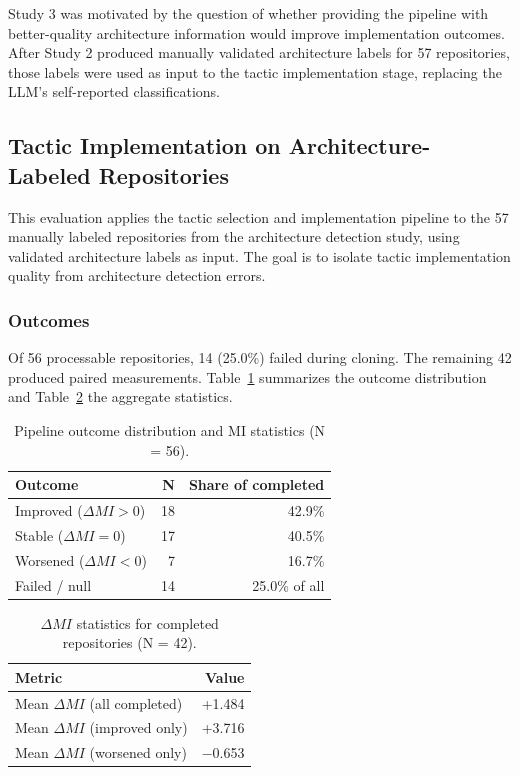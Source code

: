Study 3 was motivated by the question of whether providing the pipeline with better-quality architecture information would improve implementation outcomes. After Study 2 produced manually validated architecture labels for 57 repositories, those labels were used as input to the tactic implementation stage, replacing the LLM's self-reported classifications.

\subsection{Tactic Implementation on Architecture-Labeled Repositories}
\label{subsec:eval_tactic_impl}

This evaluation applies the tactic selection and implementation pipeline to the 57 manually labeled repositories from the architecture detection study, using validated architecture labels as input. The goal is to isolate tactic implementation quality from architecture detection errors.

\subsubsection*{Outcomes}

Of 56 processable repositories, 14 (25.0\%) failed during cloning. The remaining 42 produced paired measurements. Table~\ref{tab:exp5_outcomes} summarizes the outcome distribution and Table~\ref{tab:exp5_all} the aggregate statistics.

\begin{table}[H]
\centering
\small
\caption{Pipeline outcome distribution and MI statistics (N = 56).}
\label{tab:exp5_outcomes}
\begin{tabular}{lrr}
\toprule
\textbf{Outcome} & \textbf{N} & \textbf{Share of completed} \\
\midrule
Improved ($\Delta MI > 0$)  & 18 & 42.9\% \\
Stable ($\Delta MI = 0$)    & 17 & 40.5\% \\
Worsened ($\Delta MI < 0$)  & 7  & 16.7\% \\
Failed / null               & 14 & 25.0\% of all \\
\bottomrule
\end{tabular}
\end{table}

\begin{table}[H]
\centering
\small
\caption{$\Delta MI$ statistics for completed repositories (N = 42).}
\label{tab:exp5_all}
\begin{tabular}{lr}
\toprule
\textbf{Metric} & \textbf{Value} \\
\midrule
Mean $\Delta MI$ (all completed)  & +1.484 \\
Mean $\Delta MI$ (improved only)  & +3.716 \\
Mean $\Delta MI$ (worsened only)  & $-$0.653 \\
\bottomrule
\end{tabular}
\end{table}

